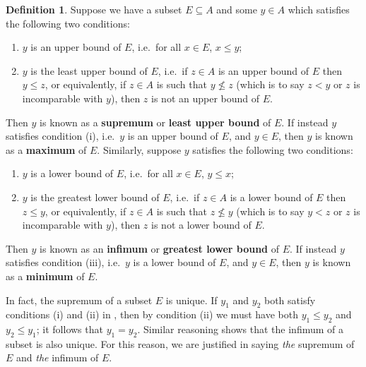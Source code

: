 \documentclass[12pt]{article}
\theoremstyle{definition}
\newtheorem{definition}{Definition}[section]
\begin{document}
\begin{definition}
\label{def:sup_inf_max_min}
    Suppose we have a subset \( E \subseteq A \) and some \( y \in A \) which satisfies the following two conditions:
    
    \begin{enumerate}[label = (\roman*)]
        \item \( y \) is an upper bound of \( E \), i.e.\ for all \( x \in E \), \( x \leq y \);
        
        \item \( y \) is the least upper bound of \( E \), i.e.\ if \( z \in A \) is an upper bound of \( E \) then \( y \leq z \), or equivalently, if \( z \in A \) is such that \( y \not\leq z \) (which is to say \( z < y \) or \( z \) is incomparable with \( y \)), then \( z \) is not an upper bound of \( E \).
    \end{enumerate}
    
    \noindent Then \( y \) is known as a \textbf{supremum} or \textbf{least upper bound} of \( E \). If instead \( y \) satisfies condition (i), i.e.\ \( y \) is an upper bound of \( E \), and \( y \in E \), then \( y \) is known as a \textbf{maximum} of \( E \). Similarly, suppose \( y \) satisfies the following two conditions:
    
    \begin{enumerate}[label = (\roman*), start = 3]
        \item \( y \) is a lower bound of \( E \), i.e.\ for all \( x \in E \), \( y \leq x \);
        
        \item \( y \) is the greatest lower bound of \( E \), i.e.\ if \( z \in A \) is a lower bound of \( E \) then \( z \leq y \), or equivalently, if \( z \in A \) is such that \( z \not\leq y \) (which is to say \( y < z \) or \( z \) is incomparable with \( y \)), then \( z \) is not a lower bound of \( E \).
    \end{enumerate}
    
    \noindent Then \( y \) is known as an \textbf{infimum} or \textbf{greatest lower bound} of \( E \). If instead \( y \) satisfies condition (iii), i.e.\ \( y \) is a lower bound of \( E \), and \( y \in E \), then \( y \) is known as a \textbf{minimum} of \( E \).
\end{definition}

In fact, the supremum of a subset \( E \) is unique. If \( y_1 \) and \( y_2 \) both satisfy conditions (i) and (ii) in , then by condition (ii) we must have both \( y_1 \leq y_2 \) and \( y_2 \leq y_1 \); it follows that \( y_1 = y_2 \). Similar reasoning shows that the infimum of a subset is also unique. For this reason, we are justified in saying \textit{the} supremum of \( E \) and \textit{the} infimum of \( E \).
\end{document}
